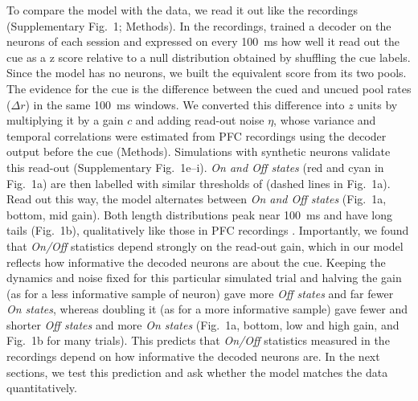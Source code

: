 \documentclass[11pt]{article}
\begin{document}
To compare the model with the data, we read it out like the recordings (Supplementary Fig.~1; Methods). In the recordings, \citet{panichello2024} trained a decoder on the neurons of each session and expressed on every 100~ms how well it read out the cue as a z score relative to a null distribution obtained by shuffling the cue labels. Since the model has no neurons, we built the equivalent score from its two pools. The evidence for the cue is the difference between the cued and uncued pool rates ($\Delta r$) in the same 100~ms windows. We converted this difference into $z$ units by multiplying it by a gain $c$ and adding read-out noise $\eta$, whose variance and temporal correlations were estimated from PFC recordings using the decoder output before the cue (Methods). Simulations with synthetic neurons validate this read-out (Supplementary Fig.~1e–i). \emph{On and Off states} (red and cyan in Fig.~1a) are then labelled with similar thresholds of \citet{panichello2024} (dashed lines in Fig.~1a). Read out this way, the model alternates between \emph{On and Off states} (Fig.~1a, bottom, mid gain). Both length distributions peak near 100~ms and have long tails (Fig.~1b), qualitatively like those in PFC recordings \citep{panichello2024}. Importantly, we found that \emph{On/Off} statistics depend strongly on the read-out gain, which in our model reflects how informative the decoded neurons are about the cue. Keeping the dynamics and noise fixed for this particular simulated trial and halving the gain (as for a less informative sample of neuron) gave more \emph{Off states} and far fewer \emph{On states}, whereas doubling it (as for a more informative sample) gave fewer and shorter \emph{Off states} and more \emph{On states} (Fig.~1a, bottom, low and high gain, and Fig.~1b for many trials). This predicts that \emph{On/Off} statistics measured in the recordings depend on how informative the decoded neurons are. In the next sections, we test this prediction and ask whether the model matches the data quantitatively.
\end{document}

